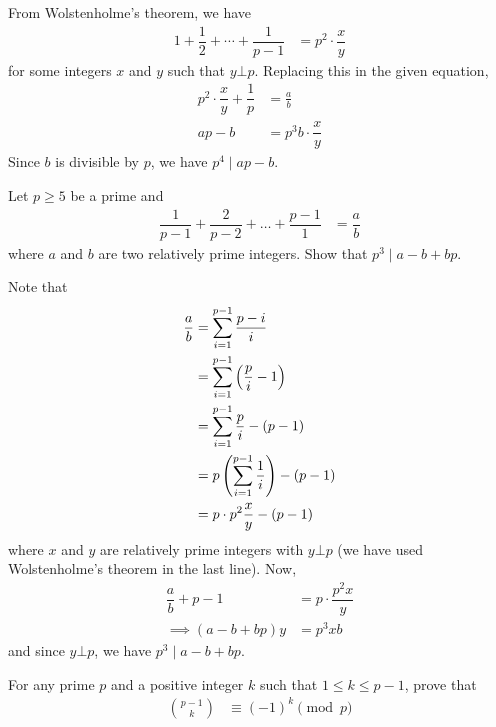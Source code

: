 	\begin{solution}
		From Wolstenholme's theorem, we have
			\begin{align*}
				1 + \dfrac{1}{2} + \cdots + \dfrac{1}{p-1}
					& = p^2 \cdot \dfrac{x}{y}
			\end{align*}
		for some integers $x$ and $y$ such that $y \bot p$. Replacing this in the given equation,
			\begin{align*}
				p^2 \cdot \dfrac{x}{y}+ \dfrac{1}{p}
					& = \frac{a}{b}\\
				ap-b
					& = p^3b \cdot \dfrac{x}{y}
			\end{align*}
		Since $b$ is divisible by $p$, we have $p^4\mid ap-b$.
	\end{solution}

	\begin{problem}
		Let $p \geq 5$ be a prime and
			\begin{align*}
				\dfrac{1}{p-1} + \dfrac{2}{p-2} + \ldots + \dfrac{p-1}{1}
					& =\dfrac{a}{b}
			\end{align*}
		where $a$ and $b$ are two relatively prime integers. Show that $p^3\mid a-b+bp$.
	\end{problem}

	\begin{solution}
		Note that
			\begin{align*}
				\dfrac{a}{b}
					& = \sum_{i=1}^{p-1} \frac{p-i}{i}\\
					& =\sum_{i=1}^{p-1}\left(\frac{p}{i} -1\right)\\
					& =\sum_{i=1}^{p-1} \dfrac{p}{i} - (p-1)\\
					& = p\left(\sum_{i=1}^{p-1} \dfrac{1}{i}\right)-(p-1)\\
					& = p \cdot p^2 \dfrac{x}{y}-(p-1)
			\end{align*}
		where $x$ and $y$ are relatively prime integers with $y \bot p$ (we have used Wolstenholme's theorem in the last line). Now,
			\begin{align*}
				\dfrac a b+p-1
					& =p\cdot\dfrac{p^2x}y\\
				\implies (a-b+bp)y
					& =p^3xb
			\end{align*}
		and since $y\bot p$, we have $p^3\mid a-b+bp$.
	\end{solution}



	\begin{problem}\label{prob:binom(p-1)(k)}
		For any prime $p$ and a positive integer $k$ such that $1 \leq k \leq p-1$, prove that
			\begin{align*}
				\binom{p-1}{k} & \equiv(-1)^k\pmod p
			\end{align*}
	\end{problem}

